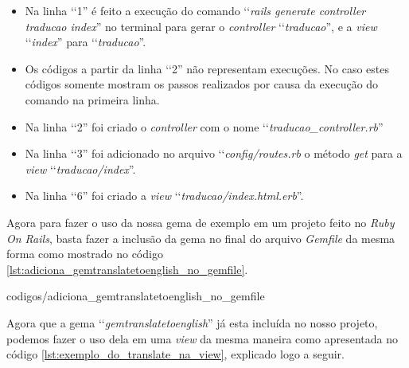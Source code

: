 \begin{itemize}

 \item Na linha ‘‘1'' é feito a execução do comando ‘‘\emph{rails generate controller traducao index}'' no
 terminal para gerar o \emph{controller} ‘‘\emph{traducao}'', e a \emph{view} ‘‘\emph{index}'' para
 ‘‘\emph{traducao}''.

 \item Os códigos a partir da linha ‘‘2'' não representam execuções. No caso estes códigos somente
 mostram os passos realizados por causa da execução do comando na primeira linha.

 \item Na linha ‘‘2'' foi criado o \emph{controller} com o nome ‘‘\emph{traducao\_controller.rb}''

 \item Na linha ‘‘3'' foi adicionado no arquivo ‘‘\emph{config/routes.rb} o método \emph{get} para a
 \emph{view} ‘‘\emph{traducao/index}''.

 \item Na linha ‘‘6'' foi criado a \emph{view} ‘‘\emph{traducao/index.html.erb}''.

\end{itemize}


Agora para fazer o uso da nossa gema de exemplo em um projeto feito no \emph{Ruby On Rails}, basta fazer a
inclusão da gema no final do arquivo \emph{Gemfile} da mesma forma como mostrado no código
\ref{lst:adiciona_gemtranslatetoenglish_no_gemfile}.

 
{codigos/adiciona_gemtranslatetoenglish_no_gemfile}

Agora que a gema ‘‘\emph{gemtranslatetoenglish}'' já esta incluída no nosso projeto, podemos fazer o uso
dela em uma \emph{view} da mesma maneira como apresentada no código \ref{lst:exemplo_do_translate_na_view},
explicado logo a seguir.

